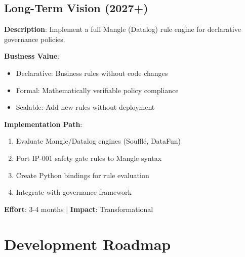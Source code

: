 \subsection{Long-Term Vision (2027+)}

\begin{tcolorbox}[colback=gray!5,colframe=gray!70,title=\faIcon{lightbulb} Vision: Mangle Rule Engine (IP-002)]
\textbf{Description}: Implement a full Mangle (Datalog) rule engine for declarative governance policies.

\textbf{Business Value}:
\begin{itemize}[nosep]
    \item Declarative: Business rules without code changes
    \item Formal: Mathematically verifiable policy compliance
    \item Scalable: Add new rules without deployment
\end{itemize}

\textbf{Implementation Path}:
\begin{enumerate}[nosep]
    \item Evaluate Mangle/Datalog engines (Soufflé, DataFun)
    \item Port IP-001 safety gate rules to Mangle syntax
    \item Create Python bindings for rule evaluation
    \item Integrate with governance framework
\end{enumerate}

\textbf{Effort}: 3-4 months | \textbf{Impact}: Transformational
\end{tcolorbox}

\section{Development Roadmap}

